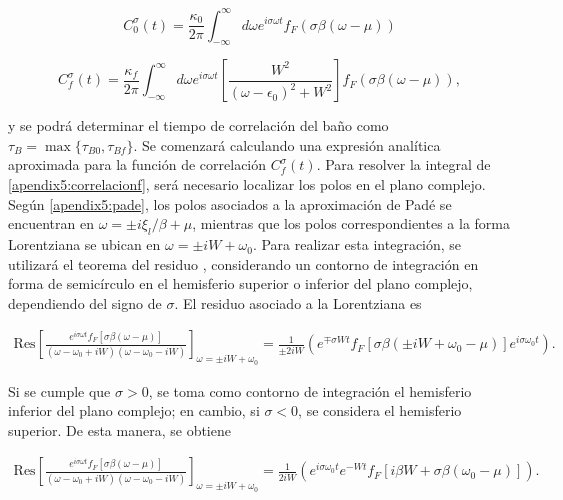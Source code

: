 \begin{appendixs}
\begin{equation}
    C^{\sigma}_{0}(t) = \frac{\kappa_{0}}{2\pi} \int_{-\infty}^{\infty}d\omega e^{i\sigma \omega t} f_{F}(\sigma \beta (\omega-\mu))
    \label{apendix5:correlacion0}
\end{equation}

\begin{equation}
    C^{\sigma}_{f}(t) = \frac{\kappa_{f}}{2\pi} \int_{-\infty}^{\infty}d\omega e^{i\sigma \omega t}\left[ \frac{W^{2}}{(\omega-\epsilon_{0})^{2} + W^{2}} \right] f_{F}(\sigma \beta (\omega-\mu)),
    \label{apendix5:correlacionf}
\end{equation}

y se podrá determinar el tiempo de correlación del baño como $\tau_{B} = \max\{\tau_{B0}, \tau_{Bf}\}$. Se comenzará calculando una expresión analítica aproximada para la función de correlación $C^{\sigma}_{f}(t)$. Para resolver la integral de \ref{apendix5:correlacionf}, será necesario localizar los polos en el plano complejo. Según \ref{apendix5:pade}, los polos asociados a la aproximación de Padé se encuentran en $\omega = \pm i \xi_{l}/\beta + \mu$, mientras que los polos correspondientes a la forma Lorentziana se ubican en $\omega = \pm i W + \omega_{0}$. Para realizar esta integración, se utilizará el teorema del residuo \cite{riley2006mathematical}, considerando un contorno de integración en forma de semicírculo en el hemisferio superior o inferior del plano complejo, dependiendo del signo de $\sigma$. El residuo asociado a la Lorentziana es

\begin{align*}
   \text{Res} \left[ \frac{e^{ i\sigma \omega t} f_{F}[\sigma \beta (\omega-\mu)] }{ (\omega-\omega_{0} + iW)(\omega -\omega_{0} -iW)}\right]_{\omega = \pm i W + \omega_{0}} = \frac{1}{\pm 2iW} ( e^{\mp \sigma Wt} f_{F}[\sigma \beta(\pm iW +\omega_{0}-\mu)]e^{i\sigma \omega_{0}t}). 
\end{align*}

Si se cumple que $\sigma > 0$, se toma como contorno de integración el hemisferio inferior del plano complejo; en cambio, si $\sigma < 0$, se considera el hemisferio superior. De esta manera, se obtiene

\begin{align*}
    \text{Res} \left[ \frac{e^{ i\sigma \omega t} f_{F}[\sigma \beta (\omega-\mu)] }{ (\omega-\omega_{0} + iW)(\omega -\omega_{0} -iW)}\right]_{\omega = \pm i W + \omega_{0}} = \frac{1}{ 2iW} ( e^{i\sigma \omega_{0}t}e^{- Wt} f_{F}[i\beta W + \sigma \beta(\omega_{0}-\mu)]). 
 \end{align*}


\end{appendixs}
